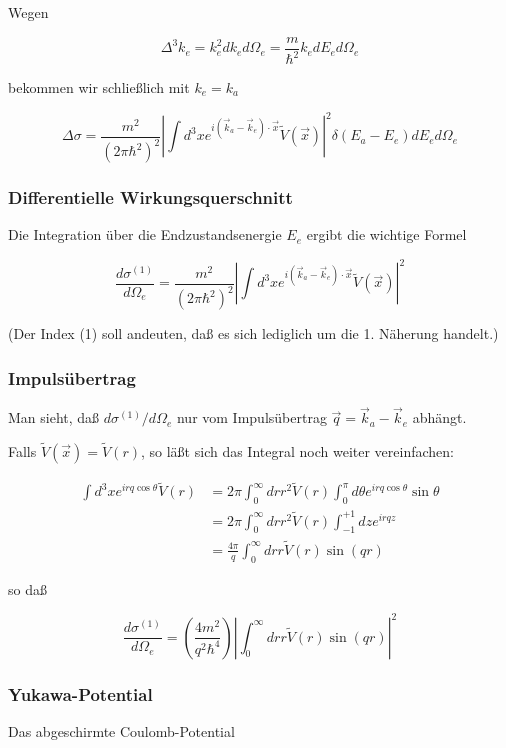 \documentclass[10pt, letterpaper]{article}
\begin{document}
Wegen

$$
\Delta^{3} k_{e}=k_{e}^{2} d k_{e} d \Omega_{e}=\frac{m}{\hbar^{2}} k_{e} d E_{e} d \Omega_{e}
$$

bekommen wir schließlich mit $k_{e}=k_{a}$

$$
\Delta \sigma=\frac{m^{2}}{\left(2 \pi \hbar^{2}\right)^{2}}\left|\int d^{3} x e^{i\left(\vec{k}_{a}-\vec{k}_{e}\right) \cdot \vec{x}} \tilde{V}(\vec{x})\right|^{2} \delta\left(E_{a}-E_{e}\right) d E_{e} d \Omega_{e}
$$

\subsubsection*{Differentielle Wirkungsquerschnitt}
Die Integration über die Endzustandsenergie $E_{e}$ ergibt die wichtige Formel

$$
\frac{d \sigma^{(1)}}{d \Omega_{e}}=\frac{m^{2}}{\left(2 \pi \hbar^{2}\right)^{2}}\left|\int d^{3} x e^{i\left(\vec{k}_{a}-\vec{k}_{e}\right) \cdot \vec{x}} \tilde{V}(\vec{x})\right|^{2}
$$

(Der Index (1) soll andeuten, daß es sich lediglich um die 1. Näherung handelt.)

\subsubsection*{Impulsübertrag}
Man sieht, daß $d \sigma^{(1)} / d \Omega_{e}$ nur vom Impulsübertrag $\vec{q}=\vec{k}_{a}-\vec{k}_{e}$ abhängt.

Falls $\tilde{V}(\vec{x})=\tilde{V}(r)$, so läßt sich das Integral noch weiter vereinfachen:

$$
\begin{aligned}
\int d^{3} x e^{i r q \cos \theta} \tilde{V}(r) & =2 \pi \int_{0}^{\infty} d r r^{2} \tilde{V}(r) \int_{0}^{\pi} d \theta e^{i r q \cos \theta} \sin \theta \\
& =2 \pi \int_{0}^{\infty} d r r^{2} \tilde{V}(r) \int_{-1}^{+1} d z e^{i r q z} \\
& =\frac{4 \pi}{q} \int_{0}^{\infty} d r r \tilde{V}(r) \sin (q r)
\end{aligned}
$$

so daß

$$
\frac{d \sigma^{(1)}}{d \Omega_{e}}=\left(\frac{4 m^{2}}{q^{2} \hbar^{4}}\right)\left|\int_{0}^{\infty} d r r \tilde{V}(r) \sin (q r)\right|^{2}
$$

\subsubsection*{Yukawa-Potential}
Das abgeschirmte Coulomb-Potential
\end{document}
